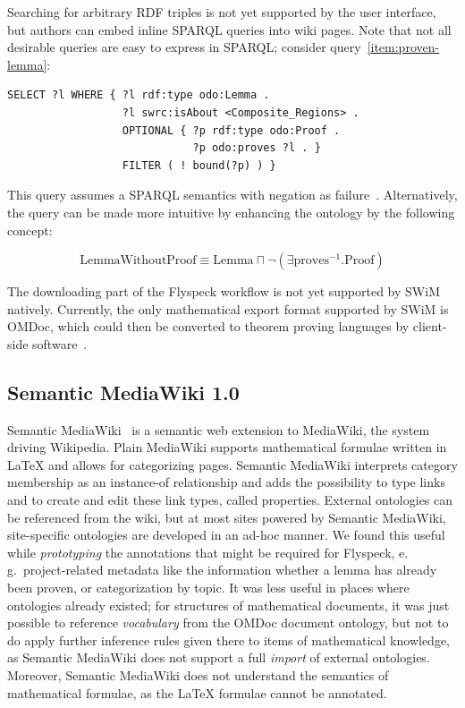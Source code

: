 \documentclass{llncs}
\begin{document}
Searching for arbitrary RDF triples is not yet supported by the user interface, but
authors can embed inline SPARQL queries into wiki pages.  Note that not all desirable
queries are easy to express in SPARQL; consider query~\ref{item:proven-lemma}:

\begin{lstlisting}
SELECT ?l WHERE { ?l rdf:type odo:Lemma .
                  ?l swrc:isAbout <Composite_Regions> .
                  OPTIONAL { ?p rdf:type odo:Proof .
                             ?p odo:proves ?l . }
                  FILTER ( ! bound(?p) ) }
\end{lstlisting}

This query assumes a SPARQL semantics with negation as failure~\cite{Polleres:SPARQL-Rules07}.  Alternatively, the query
can be made more intuitive by enhancing the ontology by the following concept:

\[
\mbox{LemmaWithoutProof}\equiv\mbox{Lemma}\sqcap\neg(\exists\mbox{proves}^{-1}.\mbox{Proof})
\]

The downloading part of the Flyspeck workflow is not yet supported by SWiM natively.
Currently, the only mathematical export format supported by SWiM is OMDoc, which could
then be converted to theorem proving languages by client-side software~\cite[chap.\
25.2]{Kohlhase:omdoc1.2}.

\subsection{Semantic MediaWiki 1.0}
\label{sec:smw-study}

Semantic MediaWiki~\cite{KrSchVr:semwiki-reasoning07} is a semantic web extension to
MediaWiki, the system driving Wikipedia.  Plain MediaWiki supports mathematical formulae
written in {\LaTeX} and allows for categorizing pages.  Semantic MediaWiki interprets
category membership as an instance-of relationship and adds the possibility to type links
and to create and edit these link types, called properties.  External ontologies can be
referenced from the wiki, but at most sites powered by Semantic MediaWiki, site-specific
ontologies are developed in an ad-hoc manner.  We found this useful while
\emph{prototyping} the annotations that might be required for Flyspeck, e.\,g.\
project-related metadata like the information whether a lemma has already been proven, or
categorization by topic.  It was less useful in places where ontologies already existed;
for structures of mathematical documents, it was just possible to reference
\emph{vocabulary} from the OMDoc document ontology, but not to do apply further inference
rules given there to items of mathematical knowledge, as Semantic MediaWiki does not
support a full \emph{import} of external ontologies.  Moreover, Semantic MediaWiki does
not understand the semantics of mathematical formulae, as the {\LaTeX} formulae cannot be
annotated.
\end{document}

